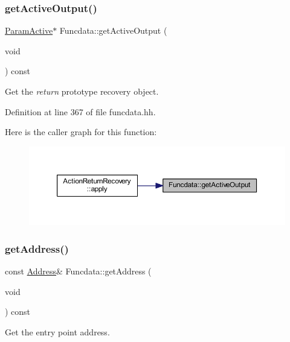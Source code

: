 \subsubsection{\texorpdfstring{getActiveOutput()}{getActiveOutput()}}
{\footnotesize\ttfamily \mbox{\hyperlink{class_param_active}{Param\+Active}}$\ast$ Funcdata\+::get\+Active\+Output (\begin{DoxyParamCaption}\item[{void}]{ }\end{DoxyParamCaption}) const\hspace{0.3cm}{\ttfamily [inline]}}



Get the {\itshape return} prototype recovery object. 



Definition at line 367 of file funcdata.\+hh.

Here is the caller graph for this function\+:
\nopagebreak
\begin{figure}[H]
\begin{center}
\leavevmode
\includegraphics[width=350pt]{class_funcdata_a4a711cda20fb99632665753918c03a65_icgraph}
\end{center}
\end{figure}
\mbox{\label{class_funcdata_ae3357db0b73196679a798903f28cd798}} 
\subsubsection{\texorpdfstring{getAddress()}{getAddress()}}
{\footnotesize\ttfamily const \mbox{\hyperlink{class_address}{Address}}\& Funcdata\+::get\+Address (\begin{DoxyParamCaption}\item[{void}]{ }\end{DoxyParamCaption}) const\hspace{0.3cm}{\ttfamily [inline]}}



Get the entry point address. 



